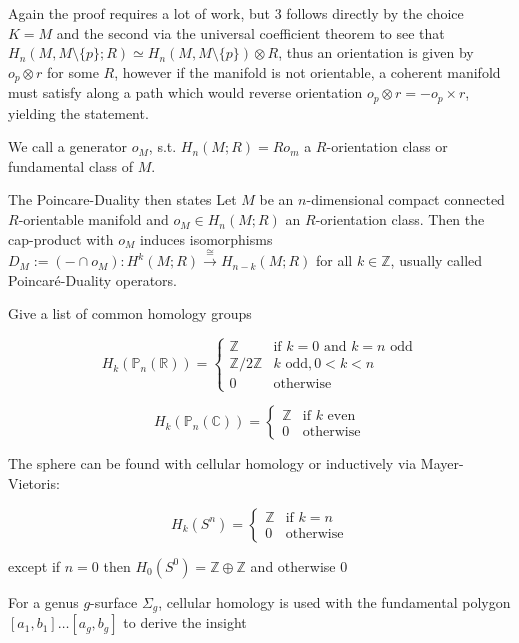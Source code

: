 Again the proof requires a lot of work, but 3 follows directly by the choice \( K = M \) and the second via the universal coefficient theorem
to see that \( H_n(M, M \setminus \{p\};R) \simeq H_n(M, M \setminus \{p\}) \otimes R \), thus an orientation is given by \( o_p \otimes r \) for some \( R \),
however if the manifold is not orientable, a coherent manifold must satisfy along a path which would reverse orientation \( o_p \otimes r = - o_p \times r \), yielding the statement.

We call a generator \( o_M \), s.t. \( H_n(M;R) = Ro_m \) a \( R \)-orientation class or fundamental class of \( M \).

The Poincare-Duality then states
Let \(M\) be an \(n\)-dimensional compact connected \(R\)-orientable manifold and \(o_M \in H_n(M; R)\) an \(R\)-orientation class. 
Then the cap-product with \(o_M\) induces isomorphisms 
\(
D_M := (-\cap o_M) \colon H^k(M; R) \xrightarrow{\cong} H_{n-k}(M; R)
\)
for all \(k \in \mathbb{Z}\), usually called Poincaré-Duality operators.



Give a list of common homology groups

\[ H_k(\mathbb{P}_n(\mathbb{R})) = 
\begin{cases} 
\mathbb{Z} & \text{if } k = 0 \text{ and } k = n \text{ odd} \\
\mathbb{Z}/2\mathbb{Z} &  k \text{ odd}, 0 < k < n \\
0 & \text{otherwise}
\end{cases} \]

\[ H_k(\mathbb{P}_n(\mathbb{C})) = 
\begin{cases} 
\mathbb{Z} & \text{if } k \text{ even} \\
0 & \text{otherwise}
\end{cases} \]

The sphere can be found with cellular homology or inductively via Mayer-Vietoris:

\[ H_k(S^n) = 
\begin{cases} 
\mathbb{Z} & \text{if } k = n \\
0 & \text{otherwise}
\end{cases} \]

except if \( n = 0 \) then \( H_0(S^0) = \mathbb{Z} \oplus \mathbb{Z} \) and otherwise \( 0 \)

For a genus \( g \)-surface \( \Sigma_g \), cellular homology is used with the fundamental polygon \( [a_1,b_1]\dots[a_g,b_g] \) to derive the insight

